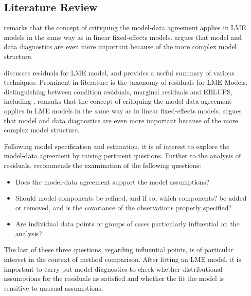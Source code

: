 \documentclass[12pt, a4paper]{report}
\theoremstyle{definition}
\theoremstyle{remark}
\begin{document}



\subsection*{Literature Review}
\citet{schabenberger} remarks that the concept of critiquing the model-data agreement applies in LME models in the same way as in linear fixed-effects models. \citet{west} argues that model and data diagnostics are even more important because of the more complex model structure.

\citet{schabenberger} discusses residuals for LME model, and provides a useful summary of various techniques. Prominent in literature is the taxonomy of residuals for LME Models, distinguishing between condition residuals, marginal residuals and EBLUPS, including \citet{hilden1995, schabenberger, west, NobreSinger2007}. \citet{schabenberger} remarks that the concept of critiquing the model-data agreement applies in LME models in the same way as in linear fixed-effects models. \citet{west} argues that model and data diagnostics are even more important because of the more complex model structure.


Following model specification and estimation, it is of interest to explore the model-data agreement by raising pertinent questions.  Further to the analysis of residuals, \citet{schabenberger} recommends the examination of the following questions:
\begin{itemize}
\item Does the model-data agreement support the model assumptions?
\item Should model components be refined, and if so, which components? %
be added or removed, and is the covariance of the observations properly specified?
\item Are individual data points or groups of cases particularly
influential on the analysis?
\end{itemize}
The last of these three questions, regarding influential points, is of particular interest in the context of method comparison. After fitting an LME model, it is important to carry put model diagnostics to check whether distributional assumptions for the residuals as satisfied and whether the fit the model is sensitive to unusual assumptions. 
\end{document}

